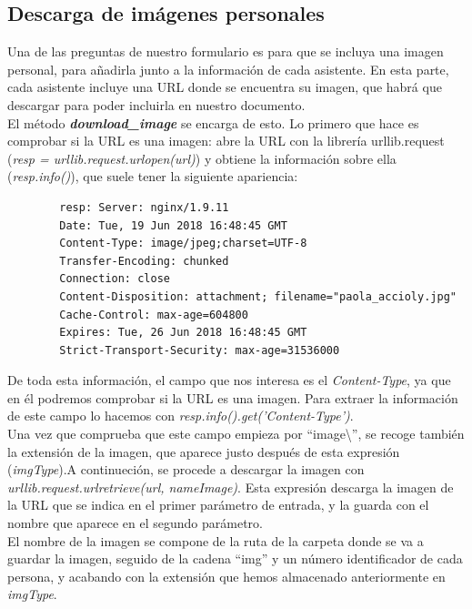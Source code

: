 \documentclass[a4paper, 12pt]{book}
\begin{document}
\subsection{Descarga de imágenes personales}
\label{subsec:imagenes}
Una de las preguntas de nuestro formulario es para que se incluya una imagen personal, para añadirla junto a la información de cada asistente. En esta parte, cada asistente incluye una URL donde se encuentra su imagen, que habrá que descargar para poder incluirla en nuestro documento.\\

El método \textbf{\textit{download\_image}} se encarga de esto. Lo primero que hace es comprobar si la URL es una imagen: abre la URL con la librería urllib.request (\textit{resp = urllib.request.urlopen(url)}) y obtiene la información sobre ella (\textit{resp.info()}), que suele tener la siguiente apariencia:
\begin{verbatim}
        resp: Server: nginx/1.9.11
        Date: Tue, 19 Jun 2018 16:48:45 GMT
        Content-Type: image/jpeg;charset=UTF-8
        Transfer-Encoding: chunked
        Connection: close
        Content-Disposition: attachment; filename="paola_accioly.jpg"
        Cache-Control: max-age=604800
        Expires: Tue, 26 Jun 2018 16:48:45 GMT
        Strict-Transport-Security: max-age=31536000
\end{verbatim}

De toda esta información, el campo que nos interesa es el \textit{Content-Type}, ya que en él podremos comprobar si la URL es una imagen. Para extraer la información de este campo lo hacemos con \textit{resp.info().get('Content-Type')}.\\

Una vez que comprueba que este campo empieza por ``image\textbackslash'', se recoge también la extensión de la imagen, que aparece justo después de esta expresión (\textit{imgType}).A continueción, se procede a descargar la imagen con \textit{urllib.request.urlretrieve(url, nameImage)}. Esta expresión descarga la imagen de la URL que se indica en el primer parámetro de entrada, y la guarda con el nombre que aparece en el segundo parámetro.\\

El nombre de la imagen se compone de la ruta de la carpeta donde se va a guardar la imagen, seguido de la cadena ``img'' y un número identificador de cada persona, y acabando con la extensión que hemos almacenado anteriormente en \textit{imgType}.\\
\end{document}

